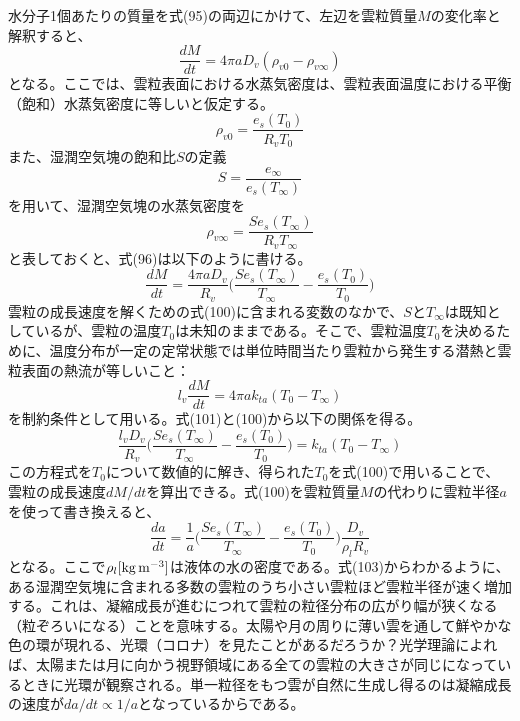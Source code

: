 \documentclass{jsarticle}
\begin{document}
水分子1個あたりの質量を式(95)の両辺にかけて、左辺を雲粒質量$M$の変化率と解釈すると、 
\begin{equation}
\frac{dM}{dt} =  4\pi a D_{v}(\rho_{v0}-\rho_{v\infty})
\end{equation}
となる。ここでは、雲粒表面における水蒸気密度は、雲粒表面温度における平衡（飽和）水蒸気密度に等しいと仮定する。
\begin{equation}
\rho_{v0} = \frac{e_{s}(T_{0})}{R_{v}T_{0}}
\end{equation}
また、湿潤空気塊の飽和比$S$の定義
\begin{equation}
S = \frac{e_{\infty}}{e_{s}(T_{\infty})}
\end{equation}
を用いて、湿潤空気塊の水蒸気密度を
\begin{equation}
\rho_{v\infty} = \frac{S e_{s}(T_{\infty})}{R_{v}T_{\infty}}
\end{equation}
と表しておくと、式(96)は以下のように書ける。
\begin{equation}
\frac{dM}{dt} = \frac{4 \pi a D_{v}}{R_{v}}{\bigg (} \frac{S e_{s}(T_{\infty})}{T_{\infty}}-\frac{e_{s}(T_{0})}{T_{0}} {\bigg )}
\end{equation}
雲粒の成長速度を解くための式(100)に含まれる変数のなかで、$S$と$T_{\infty}$は既知としているが、雲粒の温度$T_{0}$は未知のままである。そこで、雲粒温度$T_{0}$を決めるために、温度分布が一定の定常状態では単位時間当たり雲粒から発生する潜熱と雲粒表面の熱流が等しいこと：
\begin{equation}
l_{v}\frac{dM}{dt} = 4 \pi a k_{ta}(T_{0}-T_{\infty})
\end{equation}
を制約条件として用いる。式(101)と(100)から以下の関係を得る。
\begin{equation}
\frac{l_{v}D_{v}}{R_{v}} {\bigg (} \frac{S e_{s}(T_{\infty})}{T_{\infty}}-\frac{e_{s}(T_{0})}{T_{0}} {\bigg )}= k_{ta}(T_{0}-T_{\infty})
\end{equation}
この方程式を$T_{0}$について数値的に解き、得られた$T_{0}$を式(100)で用いることで、雲粒の成長速度$dM/dt$を算出できる。式(100)を雲粒質量$M$の代わりに雲粒半径$a$を使って書き換えると、
\begin{equation}
\frac{da}{dt} = \frac{1}{a}{\bigg (} \frac{S e_{s}(T_{\infty})}{T_{\infty}}-\frac{e_{s}(T_{0})}{T_{0}} {\bigg )}\frac{D_{v}}{\rho_{l} R_{v}}
\end{equation}
となる。ここで$\rho_{l} \rm[kg\, m^{-3}]$は液体の水の密度である。式(103)からわかるように、ある湿潤空気塊に含まれる多数の雲粒のうち小さい雲粒ほど雲粒半径が速く増加する。これは、凝縮成長が進むにつれて雲粒の粒径分布の広がり幅が狭くなる（粒ぞろいになる）ことを意味する。太陽や月の周りに薄い雲を通して鮮やかな色の環が現れる、光環（コロナ）を見たことがあるだろうか？光学理論によれば、太陽または月に向かう視野領域にある全ての雲粒の大きさが同じになっているときに光環が観察される。単一粒径をもつ雲が自然に生成し得るのは凝縮成長の速度が$da/dt \propto 1/a$となっているからである。
\end{document}
